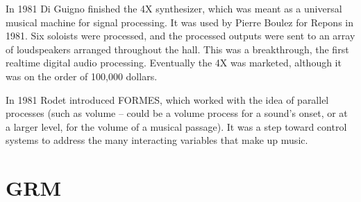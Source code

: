 In 1981 Di Guigno finished the 4X synthesizer, which was meant as a universal musical machine for signal processing. It was used by Pierre Boulez for Repons in 1981. Six soloists were processed, and the processed outputs were sent to an array of loudspeakers arranged throughout the hall. This was a breakthrough, the first realtime digital audio processing. Eventually the 4X was marketed, although it was on the order of 100,000 dollars.

In 1981 Rodet introduced FORMES, which worked with the idea of parallel processes (such as volume -- could be a volume process for a sound's onset, or at a larger level, for the volume of a musical passage). It was a step toward control systems to address the many interacting variables that make up music.

\section{GRM}


